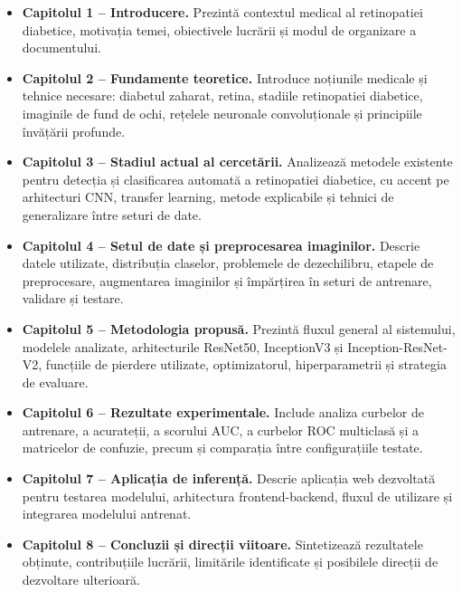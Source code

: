 \documentclass[12pt, a4paper, oneside, romanian]{teza-upb}
\begin{document}
\begin{itemize}
  \item \textbf{Capitolul 1 -- Introducere.} Prezintă contextul medical al retinopatiei diabetice, motivația temei, obiectivele lucrării și modul de organizare a documentului.

  \item \textbf{Capitolul 2 -- Fundamente teoretice.} Introduce noțiunile medicale și tehnice necesare: diabetul zaharat, retina, stadiile retinopatiei diabetice, imaginile de fund de ochi, rețelele neuronale convoluționale și principiile învățării profunde.

  \item \textbf{Capitolul 3 -- Stadiul actual al cercetării.} Analizează metodele existente pentru detecția și clasificarea automată a retinopatiei diabetice, cu accent pe arhitecturi CNN, transfer learning, metode explicabile și tehnici de generalizare între seturi de date.

  \item \textbf{Capitolul 4 -- Setul de date și preprocesarea imaginilor.} Descrie datele utilizate, distribuția claselor, problemele de dezechilibru, etapele de preprocesare, augmentarea imaginilor și împărțirea în seturi de antrenare, validare și testare.

  \item \textbf{Capitolul 5 -- Metodologia propusă.} Prezintă fluxul general al sistemului, modelele analizate, arhitecturile ResNet50, InceptionV3 și Inception-ResNet-V2, funcțiile de pierdere utilizate, optimizatorul, hiperparametrii și strategia de evaluare.

  \item \textbf{Capitolul 6 -- Rezultate experimentale.} Include analiza curbelor de antrenare, a acurateții, a scorului AUC, a curbelor ROC multiclasă și a matricelor de confuzie, precum și comparația între configurațiile testate.

  \item \textbf{Capitolul 7 -- Aplicația de inferență.} Descrie aplicația web dezvoltată pentru testarea modelului, arhitectura frontend-backend, fluxul de utilizare și integrarea modelului antrenat.

  \item \textbf{Capitolul 8 -- Concluzii și direcții viitoare.} Sintetizează rezultatele obținute, contribuțiile lucrării, limitările identificate și posibilele direcții de dezvoltare ulterioară.
\end{itemize}
\end{document}
